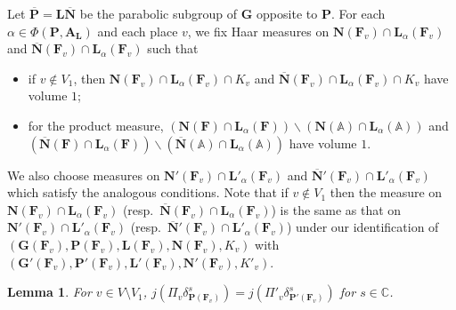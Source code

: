 \documentclass[a4paper]{amsart}
\numberwithin{equation}{section}
\newtheorem{lem}[thm]{Lemma}
\theoremstyle{remark}
\theoremstyle{definition}
\newcommand{\C}{\mathbb{C}}
\newcommand{\glob}[1]{\boldsymbol{#1}}
\begin{document}
Let $\overline{\glob{P}} = \glob{L}\overline{\glob{N}}$ be the parabolic subgroup of $\glob{G}$ opposite to $\glob{P}$.
For each $\alpha\in \Phi(\glob{P},\glob{A}_{\glob{L}})$ and each place $v$, we fix Haar measures on $\glob{N}(\glob{F}_{v}) \cap \glob{L}_{\alpha}(\glob{F}_{v})$ and $\overline{\glob{N}}(\glob{F}_{v}) \cap \glob{L}_{\alpha}(\glob{F}_{v})$ such that 
\begin{itemize}
\item if $v\notin V_{1}$, then $\glob{N}(\glob{F}_{v})\cap \glob{L}_{\alpha}(\glob{F}_{v})\cap K_{v}$ and $\overline{\glob{N}}(\glob{F}_{v})\cap \glob{L}_{\alpha}(\glob{F}_{v})\cap K_{v}$ have volume $1$;
\item for the product measure, $(\glob{N}(\glob{F}) \cap \glob{L}_{\alpha}(\glob{F}))\backslash (\glob{N}(\mathbb{A}) \cap \glob{L}_{\alpha}(\mathbb{A}))$ and $(\overline{\glob{N}}(\glob{F}) \cap \glob{L}_{\alpha}(\glob{F}))\backslash (\overline{\glob{N}}(\mathbb{A})\cap \glob{L}_{\alpha}(\mathbb{A}))$ have volume $1$.
\end{itemize}
We also choose measures on $\glob{N}'(\glob{F}_{v}) \cap \glob{L}'_{\alpha}(\glob{F}_{v})$ and $\overline{\glob{N}}'(\glob{F}_{v}) \cap \glob{L}'_{\alpha}(\glob{F}_{v})$ which satisfy the analogous conditions. 
Note that if $v\notin V_{1}$ then the measure on $\glob{N}(\glob{F}_{v})\cap \glob{L}_{\alpha}(\glob{F}_{v})$ (resp.\ $\overline{\glob{N}}(\glob{F}_{v})\cap \glob{L}_{\alpha}(\glob{F}_{v})$) is the same as that on $\glob{N}'(\glob{F}_{v}) \cap \glob{L}'_{\alpha}(\glob{F}_{v})$ (resp.\ $\overline{\glob{N}}'(\glob{F}_{v}) \cap \glob{L}'_{\alpha}(\glob{F}_{v})$) under our identification of $(\glob{G}(\glob{F}_{v}),\glob{P}(\glob{F}_{v}),\glob{L}(\glob{F}_{v}),\glob{N}(\glob{F}_{v}),K_{v})$ with $(\glob{G}'(\glob{F}_{v}),\glob{P}'(\glob{F}_{v}),\glob{L}'(\glob{F}_{v}),\glob{N}'(\glob{F}_{v}),K'_{v})$.

\begin{lem}\label{lem:comparison of mu for unramified}
For $v\in V\setminus V_{1}$, $j(\Pi_{v}\delta_{\glob{P}(\glob{F}_{v})}^{s}) = j(\Pi'_{v}\delta_{\glob{P}'(\glob{F}_{v})}^{s})$ for $s\in \C$.
\end{lem}
\end{document}

